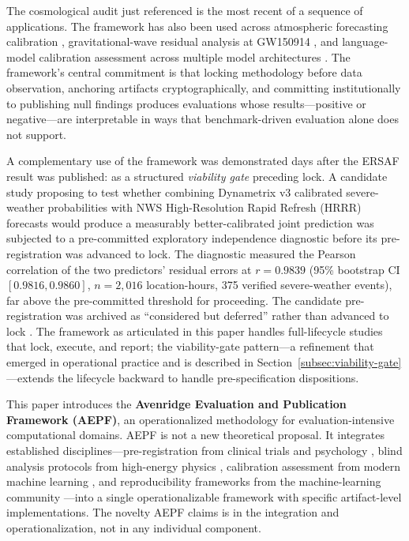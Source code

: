 \documentclass[11pt]{article}
\begin{document}
The cosmological audit just referenced is the most recent of a
sequence of applications. The framework has also been used across
atmospheric forecasting calibration \cite{dixon2026avenridge},
gravitational-wave residual analysis at GW150914
\cite{dixon2026spinphase}, and language-model calibration
assessment across multiple model architectures
\cite{dixon2026distilbert, dixon2026toxicbert,
dixon2026chatgptdetector}. The framework's central commitment is
that locking methodology before data observation, anchoring
artifacts cryptographically, and committing institutionally to
publishing null findings produces evaluations whose
results---positive or negative---are interpretable in ways that
benchmark-driven evaluation alone does not support.

A complementary use of the framework was demonstrated days after
the ERSAF result was published: as a structured \emph{viability
gate} preceding lock. A candidate study proposing to test whether
combining Dynametrix v3 calibrated severe-weather probabilities with
NWS High-Resolution Rapid Refresh (HRRR) forecasts would produce a
measurably better-calibrated joint prediction was subjected to a
pre-committed exploratory independence diagnostic before its
pre-registration was advanced to lock. The diagnostic measured the
Pearson correlation of the two predictors' residual errors at
$r = 0.9839$ (95\% bootstrap CI $[0.9816, 0.9860]$, $n = 2{,}016$
location-hours, 375 verified severe-weather events), far above the
pre-committed threshold for proceeding. The candidate pre-registration
was archived as ``considered but deferred'' rather than advanced to
lock \cite{dixon2026dynametrixhrrr}. The framework as articulated in
this paper handles full-lifecycle studies that lock, execute, and
report; the viability-gate pattern---a refinement that emerged in
operational practice and is described in
Section~\ref{subsec:viability-gate}---extends the lifecycle backward
to handle pre-specification dispositions.

This paper introduces the \textbf{Avenridge Evaluation and
Publication Framework (AEPF)}, an operationalized methodology for
evaluation-intensive computational domains. AEPF is not a new
theoretical proposal. It integrates established
disciplines---pre-registration from clinical trials and psychology
\cite{helsinki2013, nosek2018preregistration, chambers2013registered},
blind analysis protocols from high-energy physics \cite{klein2005blind},
calibration assessment from modern machine learning
\cite{brier1950, guo2017calibration, naeini2015ece}, and
reproducibility frameworks from the machine-learning community
\cite{pineau2021reproducibility}---into a single operationalizable
framework with specific artifact-level implementations. The novelty
AEPF claims is in the integration and operationalization, not in
any individual component.
\end{document}
